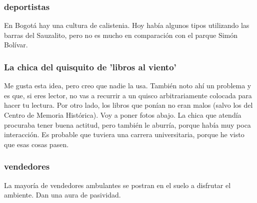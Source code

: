 \documentclass[11pt]{article}
\begin{document}
\subsubsection{deportistas}
\label{sec-2-3-3}
En Bogotá hay una cultura de calistenia. Hoy había algunos tipos utilizando las barras del Sauzalito, pero  no es mucho en comparación con el parque Simón Bolívar.

\subsubsection{La chica del quisquito de 'libros al viento'}
\label{sec-2-3-4}
Me gusta esta idea, pero creo que nadie la usa. También noto ahí un problema y es que, si eres lector, no vas a recurrir a un quisco arbitrariamente
colocada para hacer tu lectura. Por otro lado, los libros que ponían no eran malos (salvo los del Centro de Memoria Histórica). Voy a poner fotos abajo.
La chica que atendía procuraba tener buena actitud, pero también le aburría, porque había muy poca interacción. Es probable que tuviera una carrera universitaria, porque
he visto que esas cosas pasen. 


\subsubsection{vendedores}
\label{sec-2-3-5}
La mayoría de vendedores ambulantes se postran en el suelo a disfrutar el ambiente. Dan una aura de pasividad.  
\end{document}

